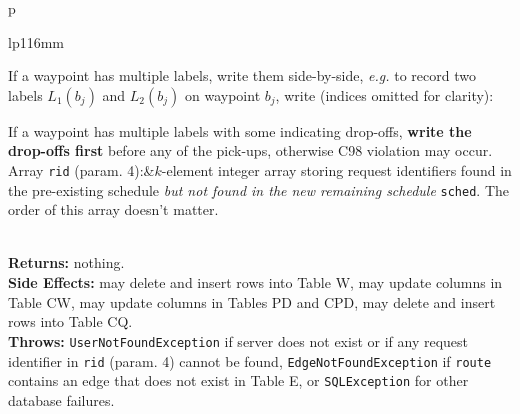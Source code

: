 \begin{tabular}{p{\textwidth}}
\begin{tabular}{lp{116mm}}

If a waypoint has multiple labels, write them side-by-side, \textit{e.g.}
to record two labels $L_1(b_j)$ and $L_2(b_j)$ on waypoint $b_j$, write
(indices omitted for clarity):


If a waypoint has multiple labels with some indicating drop-offs, \textbf{write
the drop-offs first} before any of the pick-ups, otherwise C98 violation may
occur.\\ Array {\tt{}rid} (param. 4):&$k$-element integer array storing request
identifiers found in the pre-existing schedule \emph{but not found in the new
remaining schedule} {\tt{}sched}. The order of this array doesn't matter.
\end{tabular}\\
\textbf{Returns:} nothing.\\
\textbf{Side Effects:} may delete and insert rows into Table W, may
update columns in Table CW, may update columns in Tables PD and CPD,
may delete and insert rows into Table CQ.\\
\textbf{Throws:} {\tt{}UserNotFoundException} if server does not exist or if
any request identifier in {\tt{}rid} (param. 4) cannot be found,
{\tt{}EdgeNotFoundException} if {\tt{}route} contains an edge that does not exist
in Table E, or {\tt{}SQLException} for other database failures.\\
\bottomrule
\end{tabular}
\nwenddocs{}\endmoddef{}
